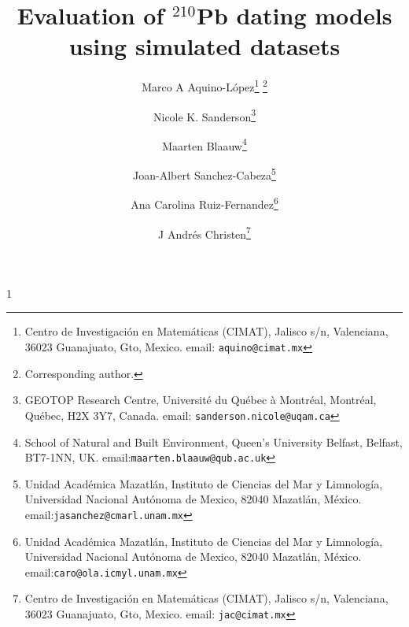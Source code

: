 \documentclass [10pt] {article}
\date{ }
\newcommand{\blind}{1}
\newcommand{\papertitle}{
	Evaluation of $^{210}$Pb dating models using simulated datasets
}
\begin{document}
	\def\spacingset#1{\renewcommand{\baselinestretch}%
		{#1}\small\normalsize} \spacingset{1}
	\blind
	{
		\title{\textbf{\papertitle}}

		\author{Marco A Aquino-L\'opez\thanks{
				Centro de Investigaci\'on en Matem\'aticas (CIMAT),
				Jalisco s/n, Valenciana, 36023 Guanajuato, Gto, Mexico.
				email: \texttt{aquino@cimat.mx} } \thanks{Corresponding author.}
					\and
			Nicole K. Sanderson\thanks{
				GEOTOP Research Centre, Université du Québec à Montréal, 
				Montréal, Québec, H2X 3Y7, Canada. 
				email: \texttt{sanderson.nicole@uqam.ca}}
					\and
			Maarten Blaauw\thanks{School of Natural and Built Environment,
				Queen's University Belfast,
				Belfast, BT7-1NN, UK.
				email:\texttt{maarten.blaauw@qub.ac.uk}  }
					\and
			Joan-Albert Sanchez-Cabeza\thanks{
				Unidad Acad\'emica Mazatl\'an, 
				Instituto de Ciencias del Mar y Limnolog\'ia, 
				Universidad Nacional Aut\'onoma de Mexico, 
				82040 Mazatl\'an, M\'exico.
				email:\texttt{jasanchez@cmarl.unam.mx}} 
					\and
			Ana Carolina Ruiz-Fernandez\thanks{
				Unidad Acad\'emica Mazatl\'an, 
				Instituto de Ciencias del Mar y Limnolog\'ia, 
				Universidad Nacional Aut\'onoma de Mexico, 
				82040 Mazatl\'an, M\'exico.
				email:\texttt{caro@ola.icmyl.unam.mx}} 
					\and
			J Andr\'es Christen\thanks{
				Centro de Investigaci\'on en Matem\'aticas (CIMAT),
				Jalisco s/n, Valenciana, 36023 Guanajuato, Gto, Mexico.
				email: \texttt{jac@cimat.mx}  }
			}
		\maketitle
	} \fi
\end{document}
